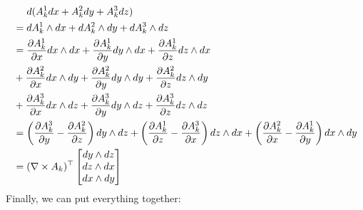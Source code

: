 \documentclass[../thesis.tex]{subfiles}
\begin{document}
\begin{align*}
  & \hspace{1.35em} d(A^1_k dx + A^2_k dy + A^3_k dz) \\
  &= dA^1_k \wedge dx + dA^2_k \wedge dy + dA^3_k \wedge dz \\
  &= \frac{\partial A^1_k}{\partial x}dx \wedge dx + \frac{\partial A^1_k}{\partial y}dy \wedge dx + \frac{\partial A^1_k}{\partial z}dz \wedge dx \\
  &+ \frac{\partial A^2_k}{\partial x}dx \wedge dy + \frac{\partial A^2_k}{\partial y}dy \wedge dy + \frac{\partial A^2_k}{\partial z}dz \wedge dy \\
  &+ \frac{\partial A^3_k}{\partial x}dx \wedge dz + \frac{\partial A^3_k}{\partial y}dy \wedge dz + \frac{\partial A^3_k}{\partial z}dz \wedge dz \\
  &= \left( \frac{\partial A^3_k}{\partial y} - \frac{\partial A^2_k}{\partial z} \right) dy \wedge dz + \left( \frac{\partial A^1_k}{\partial z} - \frac{\partial A^3_k}{\partial x} \right) dz \wedge dx + \left( \frac{\partial A^2_k}{\partial x} - \frac{\partial A^1_k}{\partial y} \right) dx \wedge dy \\
  &= (\nabla \times A_k)^{\top} \begin{bmatrix}
    dy \wedge dz \\ dz \wedge dx \\ dx \wedge dy
  \end{bmatrix} 
\end{align*}
Finally, we can put everything together:
\end{document}
